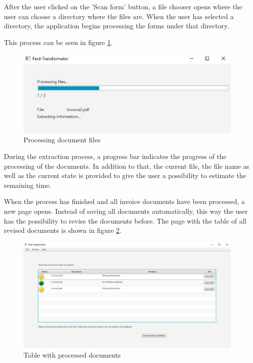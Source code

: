 After the user clicked on the 'Scan form' button, a file chooser opens where the user can choose a directory where the files are. When the user has selected a directory, the application begins processing the forms under that directory.

This process can be seen in figure \ref{processingFiles}.

\begin{figure}[ht!]
\centering
\includegraphics[width=\textwidth]{Images/GUI/processingFiles.jpg}
\caption{Processing document files \label{processingFiles}}
\end{figure}

During the extraction process, a progress bar indicates the progress of the processing of the documents. In addition to that, the current file, the file name as well as the current state is provided to give the user a possibility to estimate the remaining time.

When the process has finished and all invoice documents have been processed, a new page opens. Instead of saving all documents automatically, this way the user has the possibility to revise the documents before.
The page with the table of all revised documents is shown in figure \ref{reviseBeforeSafe}.

\begin{figure}[ht!]
\centering
\includegraphics[width=\textwidth]{Images/GUI/reviseBeforeSafe.jpg}
\caption{Table with processed documents \label{reviseBeforeSafe}}
\end{figure}


